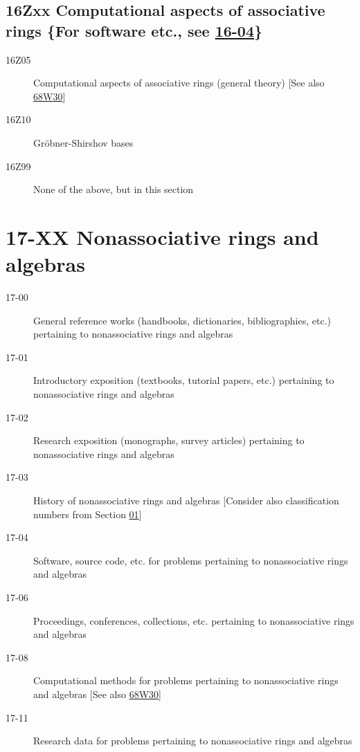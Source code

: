 \subsection*{16Zxx  Computational aspects of associative rings \{For software etc., see \hyperref[16-04]{16-04}\} }\label{16Zxx}
\begin{description}  
\item [16Z05]\label{16Z05} Computational aspects of associative rings (general theory) [See also \hyperref[68W30]{68W30}]
\item [16Z10]\label{16Z10} Gr\"obner-Shirshov bases
\item [16Z99]\label{16Z99} None of the above, but in this section
\end{description}
\section*{17-XX  Nonassociative rings and algebras }\label{17-XX}
\begin{description}
\item [17-00]\label{17-00} General reference works (handbooks, dictionaries, bibliographies, etc.) pertaining to nonassociative rings and algebras
\item [17-01]\label{17-01} Introductory exposition (textbooks, tutorial papers, etc.) pertaining to nonassociative rings and algebras
\item [17-02]\label{17-02} Research exposition (monographs, survey articles) pertaining to nonassociative rings and algebras
\item [17-03]\label{17-03} History of nonassociative rings and algebras [Consider also classification numbers from Section \hyperref[01-XX]{01}]
\item [17-04]\label{17-04} Software, source code, etc. for problems pertaining to nonassociative rings and algebras
\item [17-06]\label{17-06} Proceedings, conferences, collections, etc. pertaining to nonassociative rings and algebras
\item [17-08]\label{17-08} Computational methods for problems pertaining to nonassociative rings and algebras [See also \hyperref[68W30]{68W30}]
\item [17-11]\label{17-11} Research data for problems pertaining to nonassociative rings and algebras
\end{description}
